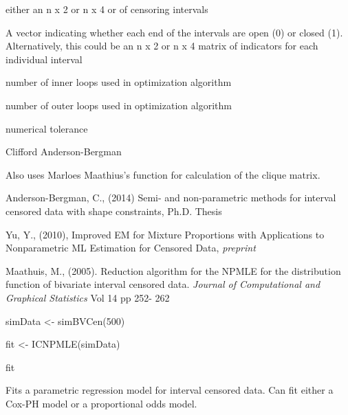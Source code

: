 \documentclass[a4paper]{book}
\begin{document}
\begin{Arguments}
\begin{ldescription}
\item[\code{times}] either an  n x 2 or n x 4  or  of censoring intervals
\item[\code{B}] A vector indicating whether each end of the intervals are open (0) or closed (1). Alternatively, this could be an n x 2 or n x 4 matrix of indicators for each individual interval
\item[\code{max.inner}] number of inner loops used in optimization algorithm
\item[\code{max.outer}] number of outer loops used in optimization algorithm
\item[\code{tol}] numerical tolerance
\end{ldescription}
\end{Arguments}
%
\begin{Author}\relax
Clifford Anderson-Bergman

Also uses Marloes Maathius's  function for calculation of the clique matrix.
\end{Author}
%
\begin{References}\relax
Anderson-Bergman, C., (2014) Semi- and non-parametric methods for interval censored data with shape constraints, Ph.D. Thesis

Yu, Y., (2010), Improved EM for Mixture Proportions with Applications to Nonparametric ML Estimation for Censored Data, \emph{preprint}

Maathuis, M., (2005). Reduction algorithm for the NPMLE for the distribution function of bivariate interval censored data. \emph{Journal of Computational and Graphical Statistics} 
Vol 14 pp 252\bsl{}- 262
\end{References}
%
\begin{Examples}
\begin{ExampleCode}
simData <- simBVCen(500)

fit <- ICNPMLE(simData)

fit
\end{ExampleCode}
\end{Examples}
%
\begin{Description}\relax
Fits a parametric regression model for interval censored data. Can fit either a Cox-PH model or a proportional odds model.  


\end{Description}
\end{document}

